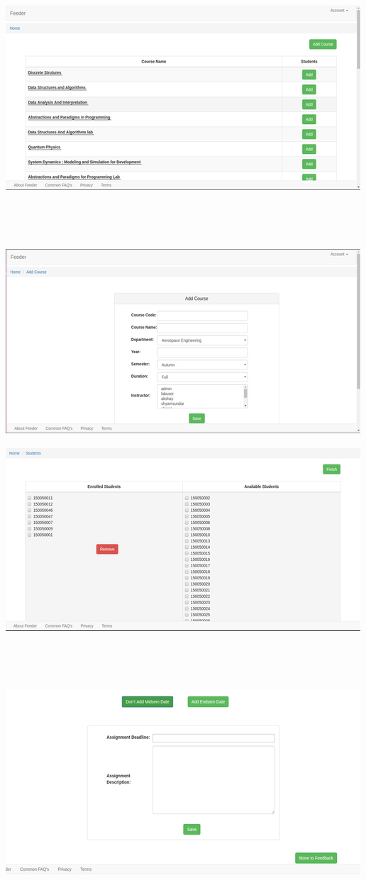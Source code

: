 \documentclass[11pt]{report}
\begin{document}
\begin{outline}
\begin{outline}
\newpage
\includegraphics{admin_home} \\ \\ \\ \\ \\
\includegraphics{add_course}

\newpage
\includegraphics{add_student}   \\ \\ \\ \\ \\
\includegraphics{add_deadline} 


\end{outline}
\end{outline}
\end{document}
